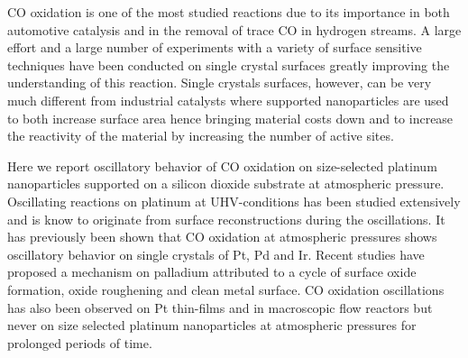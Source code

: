 \documentclass[8.5pt,twoside,twocolumn]{article}
\begin{document}




CO oxidation is one of the most studied reactions due to its importance in both automotive catalysis and in the removal of trace CO in hydrogen streams. A large effort and a large number of experiments with a variety of surface sensitive techniques have been conducted on single crystal surfaces greatly improving the understanding of this reaction. Single crystals surfaces, however, can be very much different from industrial catalysts where supported nanoparticles are used to both increase surface area hence bringing material costs down and to increase the reactivity of the material by increasing the number of active sites. 

Here we report oscillatory behavior of CO oxidation on size-selected platinum nanoparticles supported on a silicon dioxide substrate at atmospheric pressure. Oscillating reactions on platinum at UHV-conditions has been studied extensively and is know to originate from surface reconstructions during the oscillations\cite{Ertl2008}. It has previously been shown\cite{SALES1982} that CO oxidation at atmospheric pressures shows oscillatory behavior on single crystals of Pt, Pd and Ir. Recent studies have proposed a mechanism on palladium \cite{Hendriksen2010} attributed to a cycle of surface oxide formation, oxide roughening and clean metal surface. CO oxidation oscillations has also been observed on Pt thin-films\cite{Lund2000} and in macroscopic flow reactors\cite{Singh2010} but never on size selected platinum nanoparticles at atmospheric pressures for prolonged periods of time.
\end{document}
